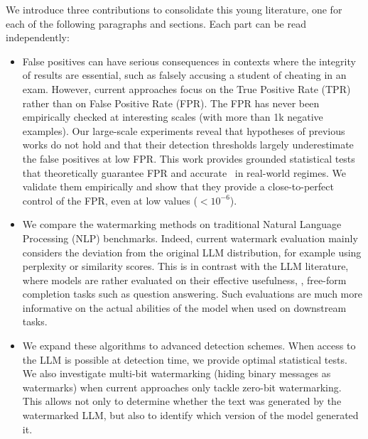 We introduce three contributions to consolidate this young literature, one for each of the following paragraphs and sections.
Each part can be read independently:
\begin{itemize}
    \item 
    False positives can have serious consequences in contexts where the integrity of results are essential, such as falsely accusing a student of cheating in an exam.
    However, current approaches focus on the True Positive Rate (TPR) rather than on False Positive Rate (FPR).
    The FPR has never been empirically checked at interesting scales (with more than 1k negative examples).
    Our large-scale experiments reveal that hypotheses of previous works do not hold and that their detection thresholds largely underestimate the false positives at low FPR.
    This work provides grounded statistical tests that theoretically guarantee FPR and accurate \pval\ in real-world regimes.
    We validate them empirically and show that they provide a close-to-perfect control of the FPR, even at low values ($<10^{-6}$).
    \item
    We compare the watermarking methods on traditional Natural Language Processing (NLP) benchmarks. 
    Indeed, current watermark evaluation mainly considers the deviation from the original LLM distribution, for example using perplexity or similarity scores.
    This is in contrast with the LLM literature, where models are rather evaluated on their effective usefulness, \eg, free-form completion tasks such as question answering.
    Such evaluations are much more informative on the actual abilities of the model when used on downstream tasks.
    \item
    We expand these algorithms to advanced detection schemes.
    When access to the LLM is possible at detection time, we provide optimal statistical tests.
    We also investigate multi-bit watermarking (hiding binary messages as watermarks) when current approaches only tackle zero-bit watermarking.
    This allows not only to determine whether the text was generated by the watermarked LLM, but also to identify which version of the model generated it.
\end{itemize}

